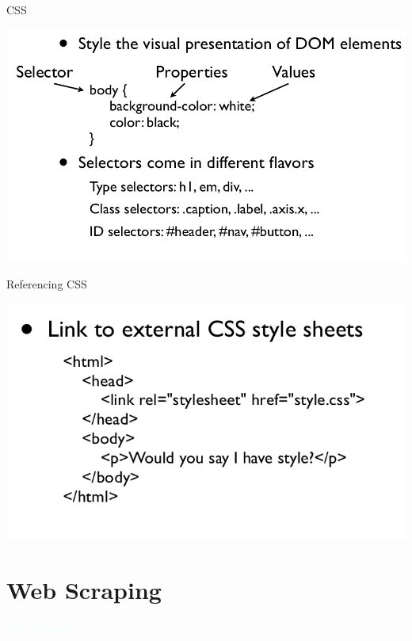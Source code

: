 \documentclass{beamer}
\newcommand{\thblue}[1]{{\Huge {\textcolor{azure}{#1}}}}
\begin{document}
\begin{frame}{CSS}
    \begin{center}
        \includegraphics[scale=0.3]{css.png}
    \end{center}
\end{frame}
\begin{frame}{Referencing CSS}
    \begin{center}
        \includegraphics[scale=0.3]{refCSS.png}
    \end{center}
\end{frame}

\section{Web Scraping}
\begin{frame}{} 
    \begin{center}
        \thblue{Web Scraping}
    \end{center}
\end{frame}
\end{document}
